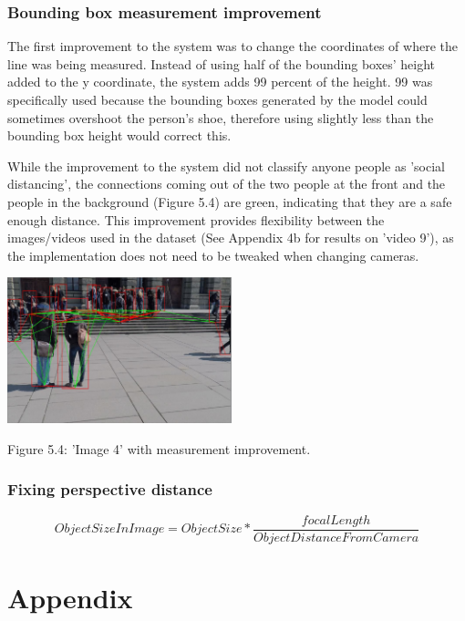 \documentclass[12pt]{report}
\begin{document}
\subsection*{Bounding box measurement improvement}

The first improvement to the system was to change the coordinates of where the line was being measured. Instead of using half of the bounding boxes' height added to the y coordinate, the system adds 99 percent of the height. 99 was specifically used because the bounding boxes generated by the model could sometimes overshoot the person's shoe, therefore using slightly less than the bounding box height would correct this. 

\vspace{2mm}

While the improvement to the system did not classify anyone people as 'social distancing', the connections coming out of the two people at the front and the people in the background  (Figure 5.4) are green, indicating that they are a safe enough distance. This improvement provides flexibility between the images/videos used in the dataset (See Appendix 4b for results on 'video 9'), as the implementation does not need to be tweaked when changing cameras. 

\begin{center}
	\includegraphics[width=65mm]{./images/appendix/BoundingBoxBottom.JPG}
	
	{\footnotesize Figure 5.4: 'Image 4' with measurement improvement.}
\end{center}

\subsection*{Fixing perspective distance}


\begin{equation*}
Object Size In Image = Object Size * \frac{focal Length}{Object Distance From Camera}
\end{equation*}

\chapter*{Appendix}
\end{document}
